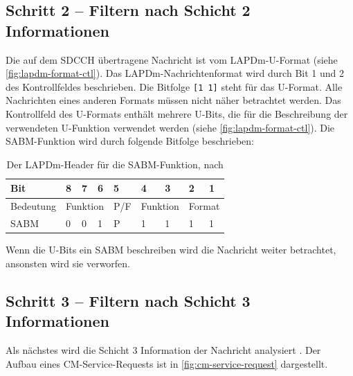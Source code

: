 \subsection*{Schritt 2 -- Filtern nach Schicht 2 Informationen}

Die auf dem \ac{SDCCH} übertragene Nachricht ist vom \ac{LAPDm}-\ac{U}-Format (siehe \autoref{fig:lapdm-format-ctl}). Das \ac{LAPDm}-Nachrichtenformat wird durch Bit 1 und 2 des Kontrollfeldes beschrieben. Die Bitfolge \texttt{[1 1]} steht für das \ac{U}-Format. Alle Nachrichten eines anderen Formats müssen nicht näher betrachtet werden. Das Kontrollfeld des \ac{U}-Formats enthält mehrere U-Bits, die für die Beschreibung der verwendeten \ac{U}-Funktion verwendet werden (siehe \autoref{fig:lapdm-format-ctl}). Die \ac{SABM}-Funktion wird durch folgende Bitfolge beschrieben:

\begin{table}[H]
\centering
\begin{tabular}{|l|l|l|l|l|l|l|l|l|}
\hline
Bit       & 8        & 7        & 6        & 5   & 4              & 3             & 2              & 1              \\ \hline
Bedeutung & \multicolumn{3}{l|}{Funktion} & P/F & \multicolumn{2}{l|}{Funktion} & \multicolumn{2}{l|}{Format} \\ \hline
SABM      & 0        & 0        & 1        & P   & 1              & 1             & 1              & 1              \\ \hline
\end{tabular}
\caption[Der LAPDm-Header für die SABM-Funktion]{Der \ac{LAPDm}-Header für die \ac{SABM}-Funktion, nach \citep[Tabelle 4]{3gpp:04.06}}
\label{tab:sabm-bits}
\end{table}

Wenn die U-Bits ein \ac{SABM} beschreiben wird die Nachricht weiter betrachtet, ansonsten wird sie verworfen.

\subsection*{Schritt 3 -- Filtern nach Schicht 3 Informationen}

Als nächstes wird die Schicht 3 Information der Nachricht analysiert \citep[Kap. 9.2.9]{3gpp:24.008}. Der Aufbau eines \ac{CM}-Service-Requests ist in \autoref{fig:cm-service-request} dargestellt.

